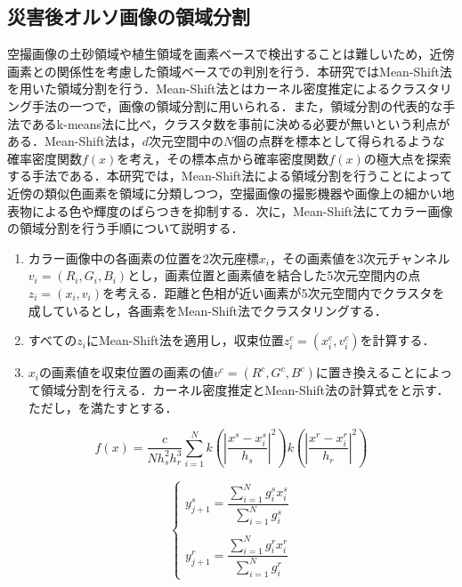    \subsection{災害後オルソ画像の領域分割}
      \label{災害後オルソ画像の領域分割}
      空撮画像の土砂領域や植生領域を画素ベースで検出することは難しいため，近傍画素との関係性を考慮した領域ベースでの判別を行う．本研究ではMean-Shift法\cite{Mean-Shift法1, Mean-Shift法2}を用いた領域分割を行う．Mean-Shift法とはカーネル密度推定によるクラスタリング手法の一つで，画像の領域分割に用いられる．また，領域分割の代表的な手法であるk-means法\cite{k-means法}に比べ，クラスタ数を事前に決める必要が無いという利点がある．Mean-Shift法は，$d$次元空間中の$N$個の点群を標本として得られるような確率密度関数$f(x)$を考え，その標本点から確率密度関数$f(x)$の極大点を探索する手法である．本研究では，Mean-Shift法による領域分割を行うことによって近傍の類似色画素を領域に分類しつつ，空撮画像の撮影機器や画像上の細かい地表物による色や輝度のばらつきを抑制する．次に，Mean-Shift法にてカラー画像の領域分割を行う手順について説明する．

      \begin{enumerate}
        \setlength{\itemsep}{-5pt}
        \item カラー画像中の各画素の位置を2次元座標$x_i$，その画素値を3次元チャンネル$v_{i} =(R_{i},G_{i},B_{i})$とし，画素位置と画素値を結合した5次元空間内の点$z_{i} = (x_{i}, v_{i})$を考える．距離と色相が近い画素が5次元空間内でクラスタを成しているとし，各画素をMean-Shift法でクラスタリングする．
        \item すべての$z_{i}$にMean-Shift法を適用し，収束位置$z_{i}^c = (x_{i}^c, v_{i}^c)$を計算する．
        \item $x_{i}$の画素値を収束位置の画素の値$v^c = (R^c, G^c, B^c)$に置き換えることによって領域分割を行える．カーネル密度推定とMean-Shift法の計算式をと示す．ただし，を満たすとする．
      \end{enumerate}
    
      \begin{equation}
        \label{Mean-Shift法1}
        f(x) = \dfrac{c} {N h_{s}^2 h_{r}^3}
          \sum_{i=1}^{N}
          k (|\dfrac{x^s - x_{i}^s} {h_{s}}|^2) k (|\dfrac{x^r - x_{i}^r} {h_{r}}|^2)
      \end{equation}

      \begin{equation}
        \label{Mean-Shift法2}
        \left\{
          \begin{array}{l}
            y_{j+1}^s = 
              \dfrac{\sum_{i=1}^{N} g_{i}^s x_{i}^s} {\sum_{i=1}^{N} g_{i}^s} \\ \\
            y_{j+1}^r = 
              \dfrac{\sum_{i=1}^{N} g_{i}^r x_{i}^r} {\sum_{i=1}^{N} g_{i}^r}
          \end{array}
        \right.
      \end{equation}

